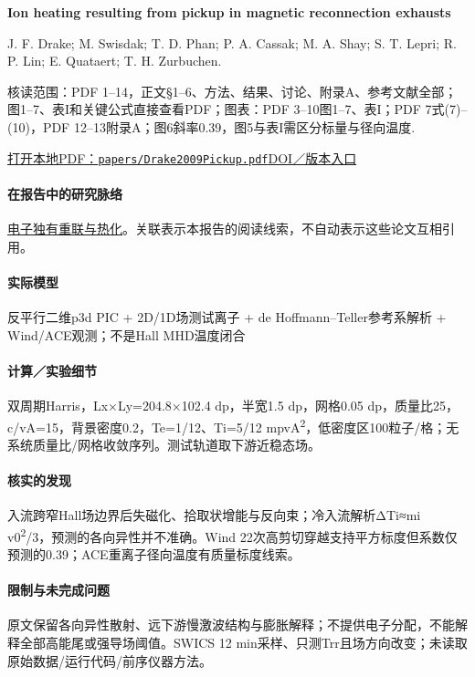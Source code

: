 \documentclass[UTF8,a4paper,11pt,openany,fontset=fandol]{ctexbook}
\begin{document}
\textbf{Ion heating resulting from pickup in magnetic reconnection exhausts}\citep{Drake2009Pickup}\

J. F. Drake;  M. Swisdak;  T. D. Phan;  P. A. Cassak;  M. A. Shay;  S. T. Lepri;  R. P. Lin;  E. Quataert;  T. H. Zurbuchen.

\textsf{核读范围：}PDF 1–14，正文§1–6、方法、结果、讨论、附录A、参考文献全部；图1–7、表I和关键公式直接查看PDF；\textsf{图表：}PDF 3–10图1–7、表I；PDF 7式(7)–(10)，PDF 12–13附录A；图6斜率0.39，图5与表I需区分标量与径向温度.

\href{run:../papers/Drake2009Pickup.pdf}{打开本地PDF：\texttt{papers/Drake2009Pickup.pdf}}\quad\href{https://doi.org/10.1029/2008JA013701}{DOI／版本入口}

\paragraph{在报告中的研究脉络}\hyperref[story:energy]{电子独有重联与热化}。关联表示本报告的阅读线索，不自动表示这些论文互相引用。

\paragraph{实际模型}反平行二维p3d PIC + 2D/1D场测试离子 + de Hoffmann–Teller参考系解析 + Wind/ACE观测；不是Hall MHD温度闭合

\paragraph{计算／实验细节}双周期Harris，Lx×Ly=204.8×102.4 dp，半宽1.5 dp，网格0.05 dp，质量比25，c/vA=15，背景密度0.2，Te=1/12、Ti=5/12 mpvA\textsuperscript{2}，低密度区100粒子/格；无系统质量比/网格收敛序列。测试轨道取下游近稳态场。

\paragraph{核实的发现}入流跨窄Hall场边界后失磁化、拾取状增能与反向束；冷入流解析ΔTi≈mi v0\textsuperscript{2}/3，预测的各向异性并不准确。Wind 22次高剪切穿越支持平方标度但系数仅预测的0.39；ACE重离子径向温度有质量标度线索。

\paragraph{限制与未完成问题}原文保留各向异性散射、远下游慢激波结构与膨胀解释；不提供电子分配，不能解释全部高能尾或强导场阈值。SWICS 12 min采样、只测Trr且场方向改变；未读取原始数据/运行代码/前序仪器方法。
\end{document}
